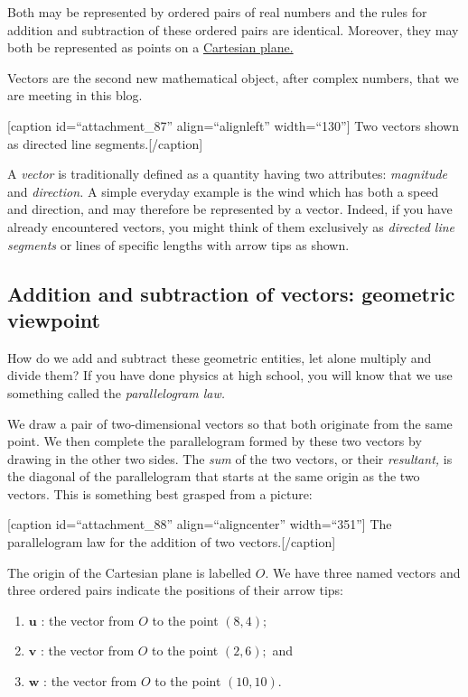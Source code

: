 \documentclass[
  a4paper,
]{article}
\providecommand{\tightlist}{%
  \setlength{\itemsep}{0pt}\setlength{\parskip}{0pt}}
\begin{document}
Both may be represented by ordered pairs of real numbers and the rules
for addition and subtraction of these ordered pairs are identical.
Moreover, they may both be represented as points on a
\href{http://en.wikipedia.org/wiki/Cartesian_coordinate_system}{Cartesian
plane.}

Vectors are the second new mathematical object, after complex numbers,
that we are meeting in this blog.

{[}caption id=``attachment\_87'' align=``alignleft'' width=``130''{]}
Two vectors shown as directed line segments.{[}/caption{]}

A \emph{vector} is traditionally defined as a quantity having two
attributes: \emph{magnitude} and \emph{direction.} A simple everyday
example is the wind which has both a speed and direction, and may
therefore be represented by a vector. Indeed, if you have already
encountered vectors, you might think of them exclusively as
\emph{directed line segments} or lines of specific lengths with arrow
tips as shown.

\hypertarget{addition-and-subtraction-of-vectors-geometric-viewpoint}{%
\subsection{Addition and subtraction of vectors: geometric
viewpoint}\label{addition-and-subtraction-of-vectors-geometric-viewpoint}}

How do we add and subtract these geometric entities, let alone multiply
and divide them? If you have done physics at high school, you will know
that we use something called the \emph{parallelogram law.}

We draw a pair of two-dimensional vectors so that both originate from
the same point. We then complete the parallelogram formed by these two
vectors by drawing in the other two sides. The \emph{sum} of the two
vectors, or their \emph{resultant,} is the diagonal of the parallelogram
that starts at the same origin as the two vectors. This is something
best grasped from a picture:

{[}caption id=``attachment\_88'' align=``aligncenter'' width=``351''{]}
The parallelogram law for the addition of two vectors.{[}/caption{]}

The origin of the Cartesian plane is labelled \(O\). We have three named
vectors and three ordered pairs indicate the positions of their arrow
tips:

\begin{enumerate}
\tightlist
\item
  \(\mathbf{u}\) : the vector from \(O\) to the point \((8, 4);\)
\item
  \(\mathbf{v}\) : the vector from \(O\) to the point \((2, 6);\) and
\item
  \(\mathbf{w}\) : the vector from \(O\) to the point \((10, 10)\).
\end{enumerate}
\end{document}
